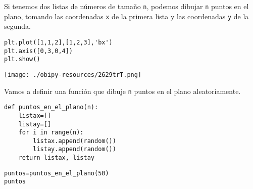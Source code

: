 \documentclass[11pt]{article}
\begin{document}
Si tenemos dos listas de números de tamaño \texttt{n}, podemos dibujar \texttt{n} puntos en el plano,
tomando las coordenadas \texttt{x} de la primera lista y las coordenadas \texttt{y} de la segunda.

\lstset{language=ipython,label= ,caption= ,captionpos=b,numbers=none}
\begin{lstlisting}
plt.plot([1,1,2],[1,2,3],'bx')
plt.axis([0,3,0,4])
plt.show()
\end{lstlisting}

\begin{center}
\texttt{[image: ./obipy-resources/2629trT.png]}
\end{center}

Vamos a definir una función que dibuje \texttt{n} puntos en el plano aleatoriamente.

\lstset{language=ipython,label= ,caption= ,captionpos=b,numbers=none}
\begin{lstlisting}
def puntos_en_el_plano(n):
    listax=[]
    listay=[]
    for i in range(n):
        listax.append(random())
        listay.append(random())
    return listax, listay
\end{lstlisting}

\lstset{language=ipython,label= ,caption= ,captionpos=b,numbers=none}
\begin{lstlisting}
puntos=puntos_en_el_plano(50)
puntos
\end{lstlisting}
\end{document}
